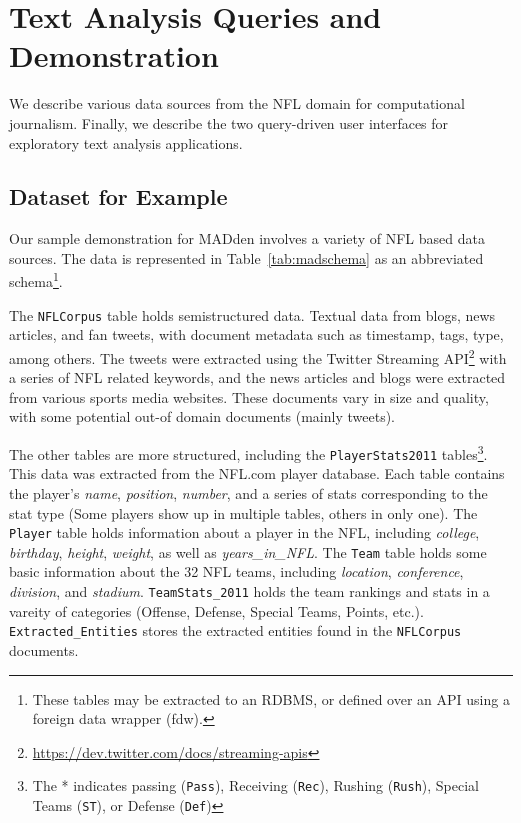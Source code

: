 \section{Text Analysis Queries and Demonstration}

We describe various data sources from the NFL domain for computational
journalism. 
Finally, we describe the two query-driven user interfaces for 
exploratory text analysis applications.


\subsection{Dataset for Example}
Our sample demonstration for MADden involves a variety of NFL based data sources. 
The data is represented in Table~\ref{tab:madschema} as an abbreviated
schema\footnote{These tables may be extracted to an RDBMS, or defined over an
API using a foreign data wrapper (fdw).}.

The {\tt NFLCorpus} table holds semistructured data. Textual data from blogs,
news articles, and fan tweets, with document metadata such as timestamp, tags,
type, among others. The tweets were extracted using the Twitter Streaming API\footnote{\url{https://dev.twitter.com/docs/streaming-apis}}
with a series of NFL related keywords, and the news articles and blogs were
extracted from various sports media websites. These documents vary in size and
quality, with some potential out-of domain documents (mainly tweets).

The other tables are more structured,
including the {\tt PlayerStats2011} tables\footnote{The * indicates passing ({\tt Pass}),
Receiving ({\tt Rec}), Rushing ({\tt Rush}), Special Teams ({\tt ST}), or
Defense ({\tt Def})\label{fn:playerstats}}.
This data was extracted from the NFL.com player database. Each table contains
the player's \textit{name}, \textit{position}, \textit{number}, and a series of
stats corresponding to the stat type (Some players show up in multiple tables, others in only one). The
{\tt Player} table holds information about a player in the NFL, including
\textit{college}, \textit{birthday}, \textit{height}, \textit{weight}, as well
as \textit{years\_in\_NFL}. The {\tt Team} table holds some basic information
about the 32 NFL teams, including \textit{location}, \textit{conference}, \textit{division}, and \textit{stadium}.
{\tt TeamStats\_2011} holds the team rankings and stats in a vareity of categories (Offense, Defense, Special Teams,
Points, etc.).
{\tt Extracted\_Entities} stores the
extracted entities found in the {\tt NFLCorpus} documents.


